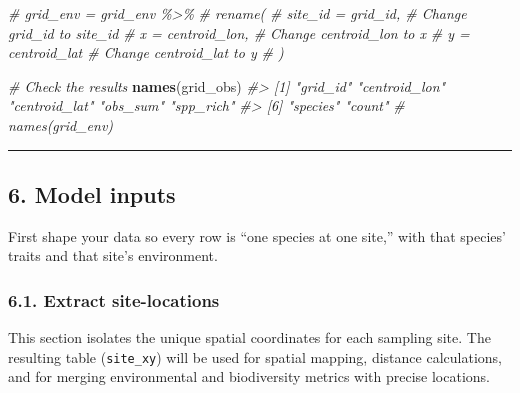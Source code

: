 \documentclass[
]{article}
\newenvironment{Shaded}{\begin{snugshade}}{\end{snugshade}}
\newcommand{\CommentTok}[1]{\textcolor[rgb]{0.56,0.35,0.01}{\textit{#1}}}
\newcommand{\FunctionTok}[1]{\textcolor[rgb]{0.13,0.29,0.53}{\textbf{#1}}}
\newcommand{\NormalTok}[1]{#1}
\begin{document}
\begin{Shaded}
\begin{Highlighting}[]
\CommentTok{\# grid\_env = grid\_env \%\textgreater{}\%}
\CommentTok{\#   rename(}
\CommentTok{\#     site\_id = grid\_id,      \# Change \textquotesingle{}grid\_id\textquotesingle{} to \textquotesingle{}site\_id\textquotesingle{}}
\CommentTok{\#     x = centroid\_lon,     \# Change \textquotesingle{}centroid\_lon\textquotesingle{} to \textquotesingle{}x\textquotesingle{}}
\CommentTok{\#     y = centroid\_lat      \# Change \textquotesingle{}centroid\_lat\textquotesingle{} to \textquotesingle{}y\textquotesingle{}}
\CommentTok{\#   )}

\CommentTok{\# Check the results}
\FunctionTok{names}\NormalTok{(grid\_obs)}
\CommentTok{\#\textgreater{} [1] "grid\_id"      "centroid\_lon" "centroid\_lat" "obs\_sum"      "spp\_rich"    }
\CommentTok{\#\textgreater{} [6] "species"      "count"}
\CommentTok{\# names(grid\_env)}
\end{Highlighting}
\end{Shaded}

\begin{center}\rule{0.5\linewidth}{0.5pt}\end{center}

\hypertarget{model-inputs}{%
\subsection{6. Model inputs}\label{model-inputs}}

First shape your data so every row is ``one species at one site,'' with
that species' traits and that site's environment.

\hypertarget{extract-site-locations}{%
\subsubsection{\texorpdfstring{6.1. Extract
\textbf{site-locations}}{6.1. Extract site-locations}}\label{extract-site-locations}}

This section isolates the unique spatial coordinates for each sampling
site. The resulting table (\texttt{site\_xy}) will be used for spatial
mapping, distance calculations, and for merging environmental and
biodiversity metrics with precise locations.
\end{document}
